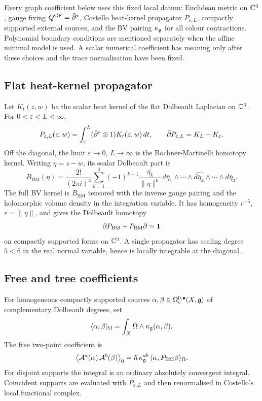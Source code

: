 Every graph coefficient below uses this fixed local datum:
Euclidean metric on \(\mathbb{C}^3\), gauge fixing \(Q^{\mathrm{GF}}=\bar\partial^{*}\),
Costello heat-kernel propagator \(P_{\varepsilon,L}\), compactly
supported external sources, and the BV pairing \(\kappa_{\mathfrak{g}}\) for
all colour contractions.  Polynomial boundary conditions are mentioned
separately when the affine minimal model is used.  A scalar numerical
coefficient has meaning only after these choices and the trace
normalisation have been fixed.

\subsection{Flat heat-kernel propagator}

Let \(K_t(z,w)\) be the scalar heat kernel of the flat Dolbeault
Laplacian on \(\mathbb{C}^3\).  For \(0<\varepsilon<L<\infty\),
\[
  P_{\varepsilon,L}(z,w)
  =
  \int_{\varepsilon}^{L}
  (\bar\partial^{*}\otimes 1)K_t(z,w)\,dt,
  \qquad
  \bar\partial P_{\varepsilon,L}=K_L-K_{\varepsilon}.
\]
Off the diagonal, the limit \(\varepsilon\to0\), \(L\to\infty\) is the
Bochner-Martinelli homotopy kernel.  Writing \(\eta=z-w\), its scalar
Dolbeault part is
\[
 B_{\mathrm{BM}}(\eta)
 =
 \frac{2!}{(2\pi i)^3}
 \sum_{k=1}^{3}(-1)^{k-1}
 \frac{\overline{\eta_k}}{\|\eta\|^6}\,
 d\bar\eta_1\wedge\cdots\wedge\widehat{d\bar\eta_k}
 \wedge\cdots\wedge d\bar\eta_3 .
\]
The full BV kernel is \(B_{\mathrm{BM}}\) tensored with the inverse
gauge pairing and the holomorphic volume density in the integration
variable.  It has homogeneity \(r^{-5}\), \(r=\|\eta\|\), and gives the
Dolbeault homotopy
\[
  \bar\partial P_{\mathrm{BM}}+P_{\mathrm{BM}}\bar\partial=\mathbf 1
\]
on compactly supported forms on \(\mathbb{C}^3\).  A single propagator has
scaling degree \(5<6\) in the real normal variable, hence is locally
integrable at the diagonal.

\subsection{Free and tree coefficients}

For homogeneous compactly supported sources
\(\alpha,\beta\in\Omega_c^{0,\bullet}(X,\mathfrak{g})\) of complementary
Dolbeault degrees, set
\[
  \langle\alpha,\beta\rangle_{\Omega}
  =
  \int_X\Omega\wedge\kappa_{\mathfrak{g}}(\alpha,\beta).
\]
The free two-point coefficient is
\[
 \bigl\langle \mathcal{A}^a(\alpha)\,\mathcal{A}^b(\beta)\bigr\rangle_0
 =
 \hbar\,\kappa_{\mathfrak{g}}^{ab}\,
 \langle\alpha,P_{\mathrm{BM}}\beta\rangle_{\Omega}.
\]
For disjoint supports the integral is an ordinary absolutely convergent
integral.  Coincident supports are evaluated with
\(P_{\varepsilon,L}\) and then renormalised in Costello's local
functional complex.

